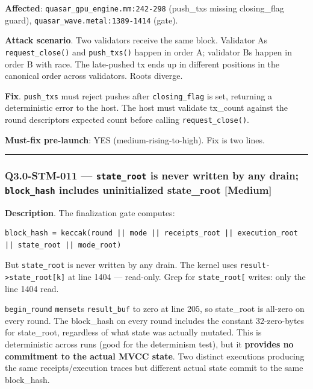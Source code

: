 \documentclass[
]{article}
\begin{document}
\textbf{Affected}: \texttt{quasar\_gpu\_engine.mm:242-298} (push\_txs
missing closing\_flag guard), \texttt{quasar\_wave.metal:1389-1414}
(gate).

\textbf{Attack scenario}. Two validators receive the same block.
Validator A\textquotesingle s \texttt{request\_close()} and
\texttt{push\_txs()} happen in order A; validator B\textquotesingle s
happen in order B with race. The late-pushed tx ends up in different
positions in the canonical order across validators. Roots diverge.

\textbf{Fix}. \texttt{push\_txs} must reject pushes after
\texttt{closing\_flag} is set, returning a deterministic error to the
host. The host must validate tx\_count against the round
descriptor\textquotesingle s expected count before calling
\texttt{request\_close()}.

\textbf{Must-fix pre-launch}: YES (medium-rising-to-high). Fix is two
lines.

\begin{center}\rule{0.5\linewidth}{0.5pt}\end{center}

\subsubsection{\texorpdfstring{Q3.0-STM-011 --- \texttt{state\_root} is
never written by any drain; \texttt{block\_hash} includes uninitialized
state\_root
{[}Medium{]}}{Q3.0-STM-011 --- state\_root is never written by any drain; block\_hash includes uninitialized state\_root {[}Medium{]}}}\label{q30-stm-011--state_root-is-never-written-by-any-drain-block_hash-includes-uninitialized-state_root-medium}

\textbf{Description}. The finalization gate computes:

\begin{verbatim}
block_hash = keccak(round || mode || receipts_root || execution_root || state_root || mode_root)
\end{verbatim}

But \texttt{state\_root} is never written by any drain. The kernel uses
\texttt{result-\textgreater{}state\_root{[}k{]}} at line 1404 ---
read-only. Grep for \texttt{state\_root{[}} writes: only the line 1404
read.

\texttt{begin\_round} \texttt{memset}s \texttt{result\_buf} to zero at
line 205, so state\_root is all-zero on every round. The block\_hash on
every round includes the constant 32-zero-bytes for state\_root,
regardless of what state was actually mutated. This is deterministic
across runs (good for the determinism test), but it \textbf{provides no
commitment to the actual MVCC state}. Two distinct executions producing
the same receipts/execution traces but different actual state commit to
the same block\_hash.
\end{document}
